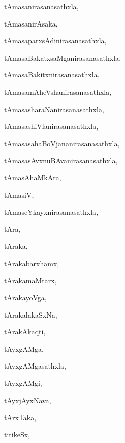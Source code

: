 \begin{multicols}{3}
{\noindent
{tAmasanirasanasathxla}, \pageref{tAmasanirasanasathxla}

\noindent
{tAmasanirAsaka}, \pageref{tAmasanirAsaka}

\noindent
{tAmasaparxsAdinirasanasathxla}, \pageref{tAmasaparxsAdinirasanasathxla}

\noindent
{tAmasaBakatxsaMganirasanasathxla}, \pageref{tAmasaBakatxsaMganirasanasathxla}

\noindent
{tAmasaBakitxnirasanasathxla}, \pageref{tAmasaBakitxnirasanasathxla}

\noindent
{tAmasamAheVshanirasanasathxla}, \pageref{tAmasamAheVshanirasanasathxla}

\noindent
{tAmasasharaNanirasanasathxla}, \pageref{tAmasasharaNanirasanasathxla}

\noindent
{tAmasashiVlanirasanasathxla}, \pageref{tAmasashiVlanirasanasathxla}

\noindent
{tAmasasahaBoVjananirasanasathxla}, \pageref{tAmasasahaBoVjananirasanasathxla}

\noindent
{tAmasasAvxnuBAvanirasanasathxla}, \pageref{tAmasasAvxnuBAvanirasanasathxla}

\noindent
{tAmasAhaMkAra}, \pageref{tAmasAhaMkAra}

\noindent
{tAmasiV}, \pageref{tAmasiV}

\noindent
{tAmaseYkayxnirasanasathxla}, \pageref{tAmaseYkayxnirasanasathxla}

\noindent
{tAra}, \pageref{tAra}

\noindent
{tAraka}, \pageref{tAraka}

\noindent
{tArakabarxhamx}, \pageref{tArakabarxhamx}

\noindent
{tArakamaMtarx}, \pageref{tArakamaMtarx}

\noindent
{tArakayoVga}, \pageref{tArakayoVga}

\noindent
{tArakalakaSxNa}, \pageref{tArakalakaSxNa}

\noindent
{tArakAkaqti}, \pageref{tArakAkaqti}

\noindent
{tAyxgAMga}, \pageref{tAyxgAMga}

\noindent
{tAyxgAMgasathxla}, \pageref{tAyxgAMgasathxla}

\noindent
{tAyxgAMgi}, \pageref{tAyxgAMgi}

\noindent
{tAyxjAyxNava}, \pageref{tAyxjAyxNava}

\noindent
{tArxTaka}, \pageref{tArxTaka}

\noindent
{titikeSx}, \pageref{titikeSx}

}
\end{multicols}

